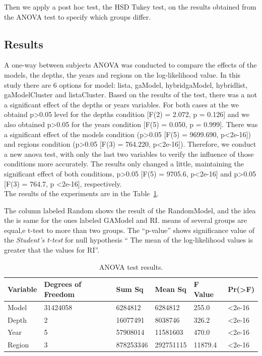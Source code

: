 Then we apply a post hoc test, the HSD Tukey test, on the results obtained from the ANOVA test to specify which groups differ. \\

\subsection{Results}
A one-way between subjects ANOVA was conducted to compare the effects of the models, the depths, the years and regions on the log-likelihood value. In this study there are 6 options for model: lista, gaModel, hybridgaModel, hybridlist, gaModelCluster and listaCluster. Based on the results of the test, there was a not a significant effect of the depths or years variables. For both cases at the we obtaind p>0.05 level for the depths condition [F(2) = 2.072, p = 0.126] and we also obtained p>0.05 for the years condition  [F(5) = 0.050, p = 0.999]. There was a significant effect of the models condition (p>0.05 [F(5) = 9699.690, p<2e-16]) and regions condition (p>0.05 [F(3) = 764.220, p<2e-16]). Therefore, we conduct a new anova test, with only the last two variables to verify the influence of those conditions more accurately. The results only changed a little, maintaining the significant effect of both conditions, p>0.05 [F(5) = 9705.6, p<2e-16] and p>0.05 [F(3) = 764.7, p <2e-16], respectively.\\

The results of the experiments are in the Table~\ref{anovatest}. 

The column labeled Random shows the result of the RandomModel, and the idea the is same for the ones labeled GAModel and RI.
 means of several groups are equal,e t-test to more than two groups.
 The ``p-value'' shows significance value of the {\it Student's t-test} for null hypothesis `` The mean of the log-likelihood values is greater that the values for RI''.\\

\begin{table}[!ht]
	\centering
	\begin{tabular}{|l|l|l|l|l|l|}
		\hline
		{Variable} & {Degrees of Freedom} & {Sum Sq}    & {Mean Sq}   & {F Value} & {Pr(\textgreater F)} \\
		\hline
		Model    & 31424058           & 6284812   & 6284812   & 255.0   & \textless2e-16     \\
		\hline
		Depth    & 2                  & 16077491  & 8038746   & 326.2   & \textless2e-16     \\
		\hline
		Year     & 5                  & 57908014  & 11581603  & 470.0   & \textless2e-16     \\
		\hline
		Region   & 3                  & 878253346 & 292751115 & 11879.4 & \textless2e-16\\    
		\hline
	\end{tabular}
	\caption{ANOVA test results.}
	\label{anovatest}
\end{table}

